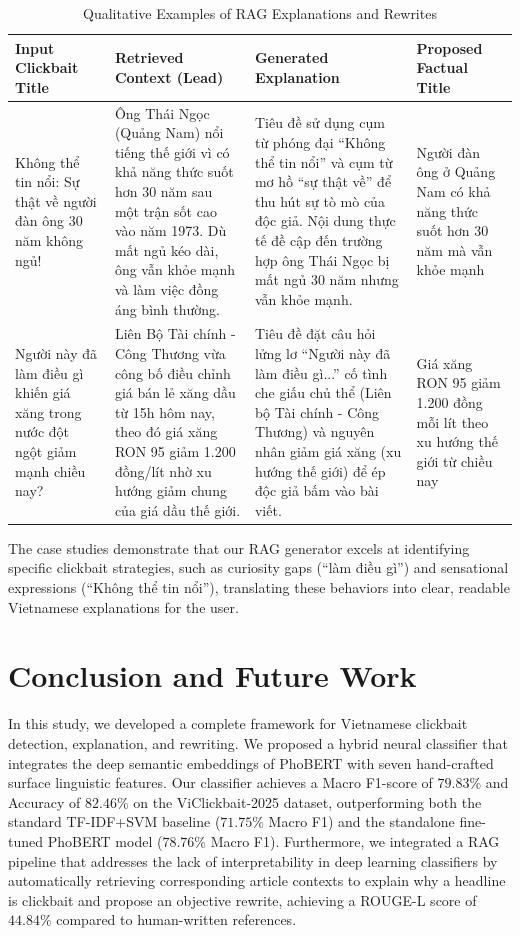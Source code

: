 \documentclass[conference]{IEEEtran}
\begin{document}
\begin{table}[!t]
\centering
\caption{Qualitative Examples of RAG Explanations and Rewrites}
\label{tab:cases}
\begin{tabular}{p{4.5cm}p{4cm}p{4cm}p{4cm}}
\toprule
\textbf{Input Clickbait Title} & \textbf{Retrieved Context (Lead)} & \textbf{Generated Explanation} & \textbf{Proposed Factual Title} \\
\midrule
Không thể tin nổi: Sự thật về người đàn ông 30 năm không ngủ! & Ông Thái Ngọc (Quảng Nam) nổi tiếng thế giới vì có khả năng thức suốt hơn 30 năm sau một trận sốt cao vào năm 1973. Dù mất ngủ kéo dài, ông vẫn khỏe mạnh và làm việc đồng áng bình thường. & Tiêu đề sử dụng cụm từ phóng đại ``Không thể tin nổi'' và cụm từ mơ hồ ``sự thật về'' để thu hút sự tò mò của độc giả. Nội dung thực tế đề cập đến trường hợp ông Thái Ngọc bị mất ngủ 30 năm nhưng vẫn khỏe mạnh. & Người đàn ông ở Quảng Nam có khả năng thức suốt hơn 30 năm mà vẫn khỏe mạnh \\
\midrule
Người này đã làm điều gì khiến giá xăng trong nước đột ngột giảm mạnh chiều nay? & Liên Bộ Tài chính - Công Thương vừa công bố điều chỉnh giá bán lẻ xăng dầu từ 15h hôm nay, theo đó giá xăng RON 95 giảm 1.200 đồng/lít nhờ xu hướng giảm chung của giá dầu thế giới. & Tiêu đề đặt câu hỏi lửng lơ ``Người này đã làm điều gì...'' cố tình che giấu chủ thể (Liên bộ Tài chính - Công Thương) và nguyên nhân giảm giá xăng (xu hướng thế giới) để ép độc giả bấm vào bài viết. & Giá xăng RON 95 giảm 1.200 đồng mỗi lít theo xu hướng thế giới từ chiều nay \\
\bottomrule
\end{tabular}
\end{table}

The case studies demonstrate that our RAG generator excels at identifying specific clickbait strategies, such as curiosity gaps (``làm điều gì'') and sensational expressions (``Không thể tin nổi''), translating these behaviors into clear, readable Vietnamese explanations for the user.

\section{Conclusion and Future Work}
In this study, we developed a complete framework for Vietnamese clickbait detection, explanation, and rewriting. We proposed a hybrid neural classifier that integrates the deep semantic embeddings of PhoBERT with seven hand-crafted surface linguistic features. Our classifier achieves a Macro F1-score of $79.83\%$ and Accuracy of $82.46\%$ on the ViClickbait-2025 dataset, outperforming both the standard TF-IDF+SVM baseline ($71.75\%$ Macro F1) and the standalone fine-tuned PhoBERT model ($78.76\%$ Macro F1). Furthermore, we integrated a RAG pipeline that addresses the lack of interpretability in deep learning classifiers by automatically retrieving corresponding article contexts to explain why a headline is clickbait and propose an objective rewrite, achieving a ROUGE-L score of $44.84\%$ compared to human-written references.
\end{document}
